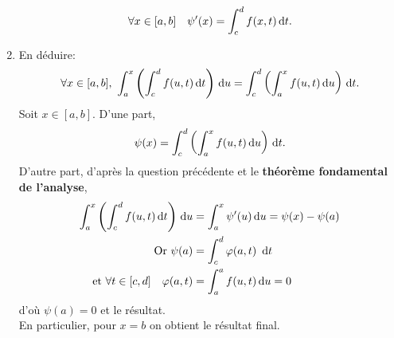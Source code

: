 \begin{preuve}
\begin{enumerate}
        $$\forall x \in [a, b] \quad \psi'(x) = \int_{c}^{d} f(x, t) \, \mathrm{d} t.$$
        \item En déduire:
        $$\forall x \in [a, b],\ \int_{a}^{x} \left ( \int_{c}^{d} f(u,t) \d t \right) \d u = \int_{c}^{d} \left ( \int_{a}^{x} f(u,t) \d u \right) \d t.$$
        Soit $x \in [a, b]$. D'une part,
        $$\psi(x) = \int_{c}^{d} \left ( \int_{a}^{x} f(u,t) \, \mathrm{d} u \right) \, \mathrm{d} t.$$
        D'autre part, d'après la question précédente et le \textbf{théorème fondamental de l'analyse}, 
        \begin{align*}
            \int_{a}^{x} \left ( \int_{c}^{d} f(u,t) \, \mathrm{d} t \right) \, \mathrm{d} u &= \int_{a}^{x} \psi'(u) \, \mathrm{d} u  = \psi(x) - \psi(a) \\
            \text{Or } \psi(a) &= \int_{c}^{d} \varphi(a, t)\ \, \mathrm{d} t \\
            \text{et } \forall t \in [c, d] \quad \varphi(a, t) &= \int_{a}^{a} f(u, t) \, \mathrm{d} u = 0
        \end{align*}
        d'où $\psi(a) = 0$ et le résultat. \\
        En particulier, pour $x = b$ on obtient le résultat final.
    \end{enumerate}
\end{preuve}    
